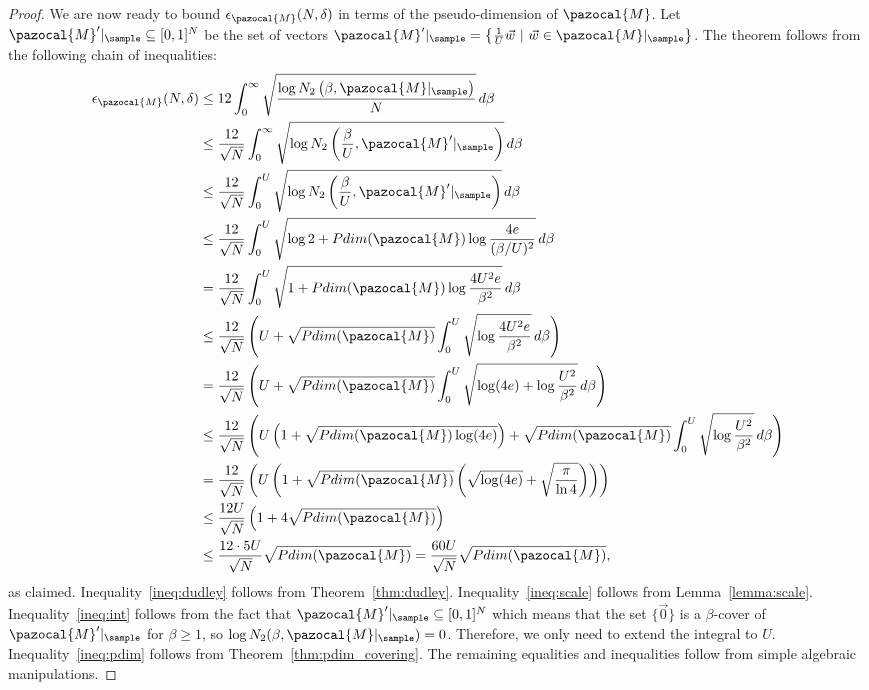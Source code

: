 \begin{proof}
We are now ready to bound $\epsilon_{\pazocal{M}}(N, \delta)$ in terms of the pseudo-dimension of $\pazocal{M}$.
Let $\pazocal{M}'|_{\sample} \subseteq [0,1]^N$ be the set of vectors $\pazocal{M}'|_{\sample} = \left\{\frac{1}{U}\vec{w} \ | \ \vec{w} \in \pazocal{M}|_{\sample}\right\}$. The theorem follows from the following chain of inequalities:
\begin{align}
\epsilon_{\pazocal{M}}(N, \delta) &\leq 12 \int_0^{\infty} \sqrt{\frac{\log N_2 \left(\beta, \pazocal{M}|_{\sample}\right)}{N}} \, d\beta \label{ineq:dudley}\\
&\leq \frac{12}{\sqrt{N}} \int_0^{\infty} \sqrt{\log N_2 \left(\frac{\beta}{U}, \pazocal{M}'|_{\sample}\right)} \, d\beta \label{ineq:scale}\\
&\leq \frac{12}{\sqrt{N}} \int_0^{U} \sqrt{\log N_2 \left(\frac{\beta}{U}, \pazocal{M}'|_{\sample}\right)} \, d\beta \label{ineq:int}\\
&\leq \frac{12}{\sqrt{N}} \int_0^{U} \sqrt{\log 2 + Pdim(\pazocal{M})\log\frac{4e}{(\beta/U)^2}} \, d\beta\label{ineq:pdim}\\
&= \frac{12}{\sqrt{N}} \int_0^{U} \sqrt{1 + Pdim(\pazocal{M})\log\frac{4U^2e}{\beta^2}} \, d\beta\\
&\leq \frac{12}{\sqrt{N}}\left(U + \sqrt{Pdim(\pazocal{M})}\int_0^{U} \sqrt{\log\frac{4U^2e}{\beta^2}} \, d\beta\right)\\
&= \frac{12}{\sqrt{N}}\left(U + \sqrt{Pdim(\pazocal{M})}\int_0^{U} \sqrt{\log (4e) + \log\frac{U^2}{\beta^2}} \, d\beta\right)\\
&\leq \frac{12}{\sqrt{N}}\left(U\left(1 + \sqrt{Pdim(\pazocal{M})\log (4e)}\right) + \sqrt{Pdim(\pazocal{M})}\int_0^{U} \sqrt{\log\frac{U^2}{\beta^2}} \, d\beta\right)\\
&= \frac{12}{\sqrt{N}}\left(U\left(1 + \sqrt{Pdim(\pazocal{M})}\left(\sqrt{\log (4e)} +\sqrt{\frac{\pi}{\ln 4}}\right)\right)\right)\\
&\leq \frac{12 U}{\sqrt{N}} \left(1 + 4\sqrt{Pdim(\pazocal{M})}\right)\\
&\leq \frac{12\cdot 5 U}{\sqrt{N}} \sqrt{Pdim(\pazocal{M})}= \frac{60 U}{\sqrt{N}} \sqrt{Pdim(\pazocal{M})},
\end{align} as claimed. Inequality~\eqref{ineq:dudley} follows from Theorem~\ref{thm:dudley}. Inequality~\eqref{ineq:scale} follows from Lemma~\ref{lemma:scale}. Inequality~\eqref{ineq:int} follows from the fact that $\pazocal{M}'|_{\sample} \subseteq [0,1]^N$ which means that  the set $\{\vec{0}\}$ is a $\beta$-cover of $\pazocal{M}'|_{\sample}$ for $\beta \geq 1$, so $\log N_2(\beta, \pazocal{M}|_{\sample}) = 0$. Therefore, we only need to extend the integral to $U$. Inequality~\eqref{ineq:pdim} follows from Theorem~\ref{thm:pdim_covering}. The remaining equalities and inequalities follow from simple algebraic manipulations.
\end{proof}

